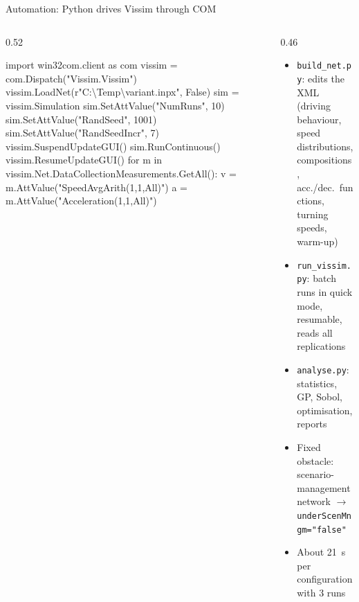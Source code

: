 \documentclass[aspectratio=169,10pt]{beamer}
\begin{document}
\begin{frame}[fragile]{Automation: Python drives Vissim through COM}
\begin{columns}[T]
\begin{column}{0.52\textwidth}
\scriptsize
\begin{semiverbatim}
\textcolor{accent}{import} win32com.client \textcolor{accent}{as} com
vissim = com.Dispatch("Vissim.Vissim")
vissim.LoadNet(r"C:\textbackslash{}Temp\textbackslash{}variant.inpx", False)
sim = vissim.Simulation
sim.SetAttValue("NumRuns", 10)
sim.SetAttValue("RandSeed", 1001)
sim.SetAttValue("RandSeedIncr", 7)
vissim.SuspendUpdateGUI()
sim.RunContinuous()
vissim.ResumeUpdateGUI()
\textcolor{accent}{for} m \textcolor{accent}{in} vissim.Net.DataCollectionMeasurements.GetAll():
    v = m.AttValue("SpeedAvgArith(1,1,All)")
    a = m.AttValue("Acceleration(1,1,All)")
\end{semiverbatim}
\end{column}
\begin{column}{0.46\textwidth}
\small
\begin{itemize}\setlength{\itemsep}{4pt}
  \item \texttt{build\_net.py}: edits the XML (driving behaviour, speed distributions,
        compositions, acc./dec.\ functions, turning speeds, warm-up)
  \item \texttt{run\_vissim.py}: batch runs in quick mode, resumable, reads all replications
  \item \texttt{analyse.py}: statistics, GP, Sobol, optimisation, reports
  \item Fixed obstacle: scenario-management network $\rightarrow$
        \texttt{underScenMngm="false"}
  \item About 21~s per configuration with 3 runs
\end{itemize}
\end{column}
\end{columns}
\end{frame}
\end{document}
